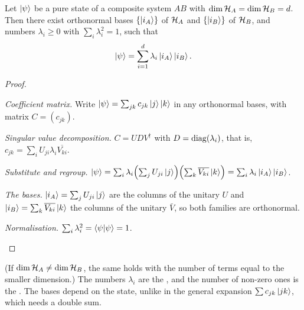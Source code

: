 \begin{theorem}\label{thm:schmidt}
  Let $\left|\psi\right\rangle$ be a pure state of a composite system $AB$ with $\dim\mathcal{H}_A=\dim\mathcal{H}_B=d$. Then there exist orthonormal bases $\{\left|i_A\right\rangle\}$ of $\mathcal{H}_A$ and $\{\left|i_B\right\rangle\}$ of $\mathcal{H}_B$, and numbers $\lambda_i\ge0$ with $\sum_i\lambda_i^2=1$, such that
  \[
    \left|\psi\right\rangle=\sum_{i=1}^{d}\lambda_i\left|i_A\right\rangle\left|i_B\right\rangle.
  \]
\end{theorem}
\begin{proof}
  \begin{steps}
    \item \emph{Coefficient matrix.} Write $\left|\psi\right\rangle=\sum_{jk}c_{jk}\left|j\right\rangle\left|k\right\rangle$ in any orthonormal bases, with matrix $C=(c_{jk})$.
    \item \emph{Singular value decomposition.} $C=UDV^\dagger$ with $D=\operatorname{diag}(\lambda_i)$, that is, $c_{jk}=\sum_iU_{ji}\lambda_i\overline{V_{ki}}$.
    \item \emph{Substitute and regroup.} $\left|\psi\right\rangle=\sum_i\lambda_i\Bigl(\sum_jU_{ji}\left|j\right\rangle\Bigr)\Bigl(\sum_k\overline{V_{ki}}\left|k\right\rangle\Bigr)=\sum_i\lambda_i\left|i_A\right\rangle\left|i_B\right\rangle$.
    \item \emph{The bases.} $\left|i_A\right\rangle=\sum_jU_{ji}\left|j\right\rangle$ are the columns of the unitary $U$ and $\left|i_B\right\rangle=\sum_k\overline{V_{ki}}\left|k\right\rangle$ the columns of the unitary $\bar V$, so both families are orthonormal.
    \item \emph{Normalisation.} $\sum_i\lambda_i^2=\left\langle\psi\middle|\psi\right\rangle=1$. \qedhere
  \end{steps}
\end{proof}

(If $\dim\mathcal{H}_A\neq\dim\mathcal{H}_B$, the same holds with the number of terms equal to the smaller dimension.) The numbers $\lambda_i$ are the , and the number of non-zero ones is the . The bases depend on the state, unlike in the general expansion $\sum c_{jk}\left|jk\right\rangle$, which needs a double sum.

